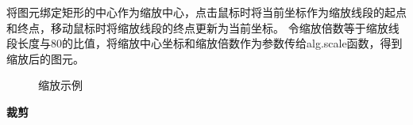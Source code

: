 \documentclass[a4paper,UTF8]{article}
\begin{document}
将图元绑定矩形的中心作为缩放中心，点击鼠标时将当前坐标作为缩放线段的起点和终点，移动鼠标时将缩放线段的终点更新为当前坐标。
令缩放倍数等于缩放线段长度与80的比值，将缩放中心坐标和缩放倍数作为参数传给alg.scale函数，得到缩放后的图元。
\begin{figure}[H]
    \centering
        \caption{缩放示例}
\end{figure}


\textbf{裁剪}
\end{document}
